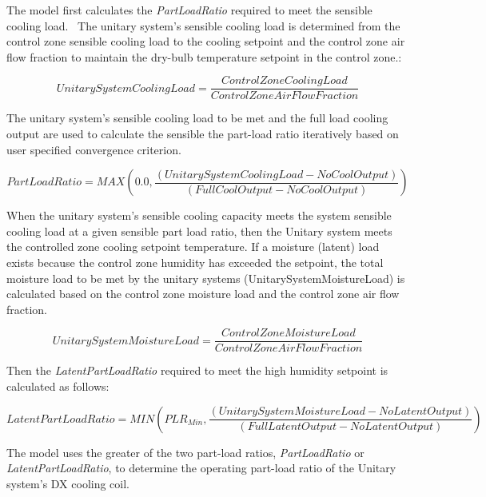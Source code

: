 The model first calculates the \emph{PartLoadRatio} required to meet the sensible cooling load.~ The unitary system's sensible cooling load is determined from the control zone sensible cooling load to the cooling setpoint and the control zone air flow fraction to maintain the dry-bulb temperature setpoint in the control zone.:

\begin{equation}
UnitarySystemCoolingLoad = \frac{{ControlZoneCoolingLoad}}{{ControlZoneAirFlowFraction}}
\end{equation}

The unitary system's sensible cooling load to be met and the full load cooling output are used to calculate the sensible the part-load ratio iteratively based on user specified convergence criterion.

\begin{equation}
PartLoadRatio = MAX\left( {0.0,\frac{{\left( {UnitarySystemCoolingLoad - NoCoolOutput} \right)}}{{\left( {FullCoolOutput - NoCoolOutput} \right)}}} \right)
\end{equation}

When the unitary system's sensible cooling capacity meets the system sensible cooling load at a given sensible part load ratio, then the Unitary system meets the controlled zone cooling setpoint temperature. If a moisture (latent) load exists because the control zone humidity has exceeded the setpoint, the total moisture load to be met by the unitary systems (UnitarySystemMoistureLoad) is calculated based on the control zone moisture load and the control zone air flow fraction.

\begin{equation}
UnitarySystemMoistureLoad = \frac{{ControlZoneMoistureLoad}}{{ControlZoneAirFlowFraction}}
\end{equation}

Then the \emph{LatentPartLoadRatio} required to meet the high humidity setpoint is calculated as follows:

\begin{equation}
  LatentPartLoadRatio = MIN\left( {PL{R_{Min}},\frac{{\left( {UnitarySystemMoistureLoad - NoLatentOutput} \right)}}{{\left( {FullLatentOutput - NoLatentOutput} \right)}}} \right)
\end{equation}

The model uses the greater of the two part-load ratios, \emph{PartLoadRatio} or \emph{LatentPartLoadRatio}, to determine the operating part-load ratio of the Unitary system's DX cooling coil.

